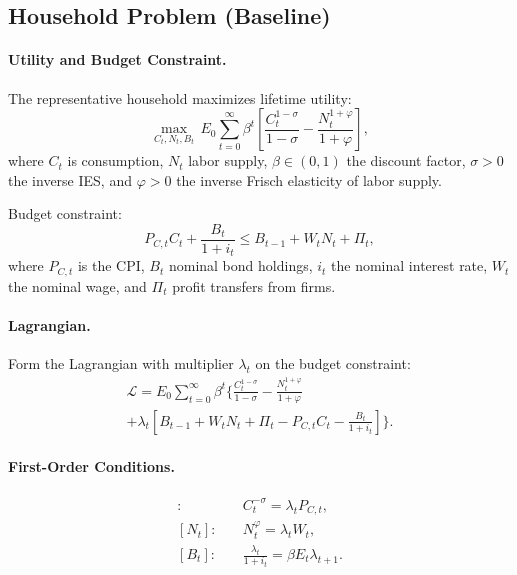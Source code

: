 \documentclass[12pt,a4paper]{article}
\begin{document}
\begin{appendices}
\subsection{Household Problem (Baseline)}
\label{app:household}

\paragraph{Utility and Budget Constraint.}
The representative household maximizes lifetime utility:
\begin{equation}
	\max_{C_t, N_t, B_t} \, E_0 \sum_{t=0}^\infty \beta^t \left[ \frac{C_t^{1-\sigma}}{1-\sigma} - \frac{N_t^{1+\varphi}}{1+\varphi} \right],
	\label{eq:app_utility_baseline}
\end{equation}
where $C_t$ is consumption, $N_t$ labor supply, $\beta \in (0,1)$ the discount factor, $\sigma > 0$ the inverse IES, and $\varphi > 0$ the inverse Frisch elasticity of labor supply.

Budget constraint:
\begin{equation}
	P_{C,t} C_t + \frac{B_t}{1+i_t} \leq B_{t-1} + W_t N_t + \Pi_t,
	\label{eq:app_budget}
\end{equation}
where $P_{C,t}$ is the CPI, $B_t$ nominal bond holdings, $i_t$ the nominal interest rate, $W_t$ the nominal wage, and $\Pi_t$ profit transfers from firms.

\paragraph{Lagrangian.}
Form the Lagrangian with multiplier $\lambda_t$ on the budget constraint:
\begin{multline}
	\mathcal{L} = E_0 \sum_{t=0}^\infty \beta^t \Bigg\{ \frac{C_t^{1-\sigma}}{1-\sigma} - \frac{N_t^{1+\varphi}}{1+\varphi} \\
	+ \lambda_t \left[ B_{t-1} + W_t N_t + \Pi_t - P_{C,t} C_t - \frac{B_t}{1+i_t} \right] \Bigg\}.
	\label{eq:app_lagrangian}
\end{multline}

\paragraph{First-Order Conditions.}
\begin{align}
	[C_t]: \quad & C_t^{-\sigma} = \lambda_t P_{C,t}, \label{eq:app_foc_C_baseline} \\
	[N_t]: \quad & N_t^\varphi = \lambda_t W_t, \label{eq:app_foc_N} \\
	[B_t]: \quad & \frac{\lambda_t}{1+i_t} = \beta E_t \lambda_{t+1}. \label{eq:app_foc_B}
\end{align}


\end{appendices}
\end{document}
